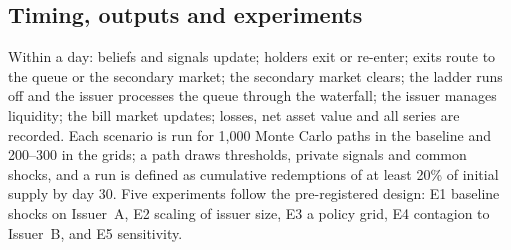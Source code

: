 \subsection{Timing, outputs and experiments}

Within a day: beliefs and signals update; holders exit or re-enter; exits route to the queue or the secondary market;
the secondary market clears; the ladder runs off and the issuer processes the queue through the waterfall; the
issuer manages liquidity; the bill market updates; losses, net asset value and all series are recorded. Each
scenario is run for 1{,}000 Monte Carlo paths in the baseline and 200--300 in the grids; a path draws thresholds,
private signals and common shocks, and a run is defined as cumulative redemptions of at least 20\% of initial
supply by day 30. Five experiments follow the pre-registered design: E1 baseline shocks on Issuer~A, E2 scaling of
issuer size, E3 a policy grid, E4 contagion to Issuer~B, and E5 sensitivity.
